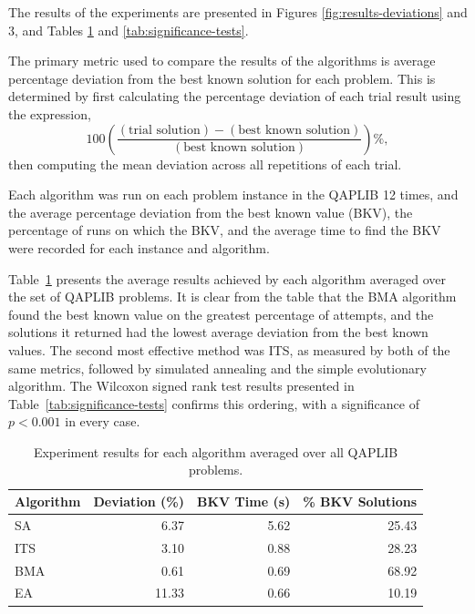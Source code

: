 The results of the experiments are presented in Figures \ref{fig:results-deviations} and 3, and Tables \ref{tab:average-results} and \ref{tab:significance-tests}.

The primary metric used to compare the results of the algorithms is average percentage deviation from the best known solution for each problem.
This is determined by first calculating the percentage deviation of each trial result using the expression,
\[
    100\left(\frac{(\text{trial solution})- (\text{best known solution})}{(\text{best known solution})}\right)\%,
\]
then computing the mean deviation across all repetitions of each trial.

Each algorithm was run on each problem instance in the QAPLIB 12 times, and the average percentage deviation from the best known value (BKV), the percentage of runs on which the BKV, and the average time to find the BKV were recorded for each instance and algorithm.

Table~\ref{tab:average-results} presents the average results achieved by each algorithm averaged over the set of QAPLIB problems.
It is clear from the table that the BMA algorithm found the best known value on the greatest percentage of attempts, and the solutions it returned had the lowest average deviation from the best known values.
The second most effective method was ITS, as measured by both of the same metrics, followed by simulated annealing and the simple evolutionary algorithm.
The Wilcoxon signed rank test results presented in Table~\ref{tab:significance-tests} confirms this ordering, with a significance of \(p<0.001\) in every case.

\begin{table}[h]
    \centering
    \caption{Experiment results for each algorithm averaged over all QAPLIB problems.}
    \label{tab:average-results}
    \begin{tabularx}{0.74\textwidth}{@{}l|rrr@{}}
        \toprule
        Algorithm & Deviation (\%) & BKV Time (s) & \% BKV Solutions \\
        \midrule
        SA  &  6.37 & 5.62 & 25.43 \\
        ITS &  3.10 & 0.88 & 28.23 \\
        BMA &  0.61 & 0.69 & 68.92 \\
        EA  & 11.33 & 0.66 & 10.19 \\
        \bottomrule
    \end{tabularx}
\end{table}

